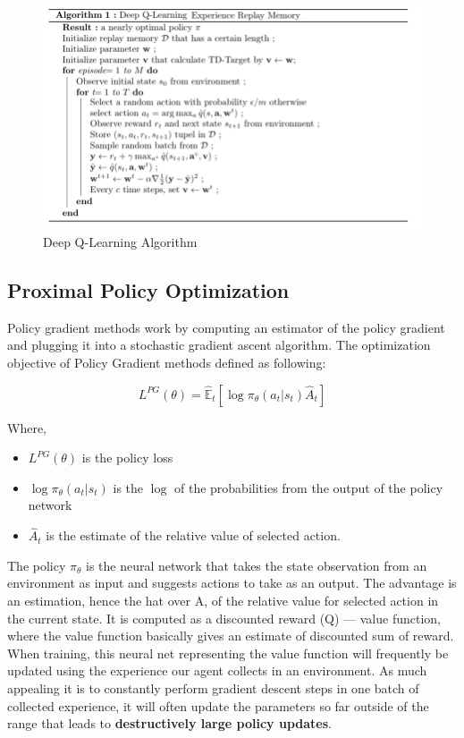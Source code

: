 \documentclass[conference]{IEEEtran}
\begin{document}
\begin{figure}[htbp]
\centerline{\includegraphics[width=1.0\linewidth]{images/DQN-Algorithm.png}}
\caption{Deep Q-Learning Algorithm}
\label{fig4}
\end{figure}

\subsection{Proximal Policy Optimization}
Policy gradient methods work by computing an estimator of the policy gradient and plugging it
into a stochastic gradient ascent algorithm. The optimization objective of Policy Gradient methods defined as following:

\begin{equation}
    {L}^{PG}(\theta) = {\hat{\mathbb{E}}}_{t}[\log\pi_{\theta}({a}_{t} | {s}_{t})\hat{A}_{t}]
\end{equation}

Where,
\begin{itemize}
    \item ${L}^{PG}(\theta)$ is the policy loss
    \item $\log\pi_{\theta}({a}_{t} | {s}_{t})$ is the $\log$ of the probabilities from the output of the policy network
    \item $\hat{A}_{t}$ is the estimate of the relative value of selected action.
\end{itemize}

The policy $\pi_{\theta}$ is the neural network that takes the state observation from an environment as input and suggests actions to take as an output.
The advantage is an estimation, hence the hat over A, of the relative value for selected action in the current state. It is computed as a discounted reward (Q) — value function, where the value function basically gives an estimate of discounted sum of reward. When training, this neural net representing the value function will frequently be updated using the experience our agent collects in an environment.
As much appealing it is to constantly perform gradient descent steps in one batch of collected experience, it will often update the parameters so far outside of the range that leads to \textbf{destructively large policy updates}.
\end{document}
